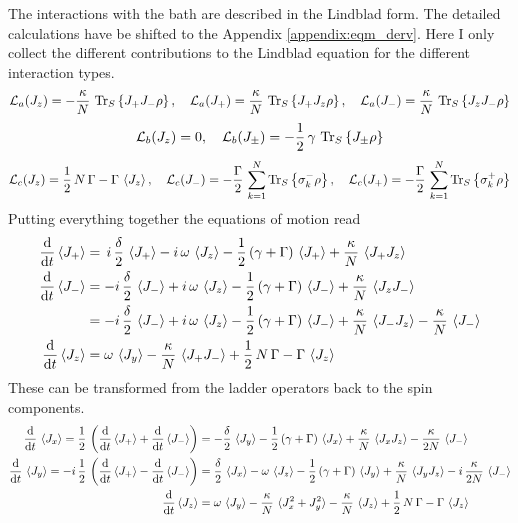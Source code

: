 \documentclass{article}
\begin{document}
The interactions with the bath are described in the Lindblad form. The detailed calculations have be shifted to the Appendix \ref{appendix:eqm_derv}. Here I only collect the different contributions to the Lindblad equation for the different interaction types.
\begin{align*}
    \mathcal{L}_a(J_z)=-\frac{\kappa}{N}\,\operatorname{Tr}_S\left\{J_+ J_- \rho\right\},\quad
    \mathcal{L}_a(J_+)=\frac{\kappa}{N}\,\operatorname{Tr}_S\left\{J_+ J_z \rho\right\},\quad
    \mathcal{L}_a(J_-)=\frac{\kappa}{N}\,\operatorname{Tr}_S\left\{J_z J_- \rho\right\}
\end{align*}
\begin{align*}
    \mathcal{L}_b(J_z)=0,\quad
    \mathcal{L}_b(J_\pm)=-\frac{1}{2}\,\gamma\,\operatorname{Tr}_S\left\{J_\pm\rho\right\}
\end{align*}
\begin{align*}
    \mathcal{L}_c(J_z)=\frac{1}{2}\,N\,\Gamma-\Gamma\,\braket{J_z},\quad
    \mathcal{L}_c(J_-)=-\frac{\Gamma}{2}\,\sum_{k=1}^N\operatorname{Tr}_S\left\{\sigma_k^-\rho\right\},\quad
    \mathcal{L}_c(J_+)=-\frac{\Gamma}{2}\,\sum_{k=1}^N\operatorname{Tr}_S\left\{\sigma_k^+\rho\right\}
\end{align*}
Putting everything together the equations of motion read
\begin{align*}
    \frac{\text{d}}{\text{d}t} \braket{J_+}&=\,i\,\frac{\delta}{2}\,\braket{J_+}-i\,\omega\,\braket{J_z}-\frac{1}{2}\,(\gamma+\Gamma)\,\braket{J_+}+\frac{\kappa}{N}\,\braket{J_+ J_z}\\
    \frac{\text{d}}{\text{d}t} \braket{J_-}&=-i\,\frac{\delta}{2}\,\braket{J_-}+i\,\omega\,\braket{J_z}-\frac{1}{2}\,(\gamma+\Gamma)\,\braket{J_-}+\frac{\kappa}{N}\,\braket{J_z J_-}\\
    &=-i\,\frac{\delta}{2}\,\braket{J_-}+i\,\omega\,\braket{J_z}-\frac{1}{2}\,(\gamma+\Gamma)\,\braket{J_-}+\frac{\kappa}{N}\,\braket{J_- J_z}-\frac{\kappa}{N}\,\braket{J_-}\\
    \frac{\text{d}}{\text{d}t} \braket{J_z}&=\omega\,\braket{J_y} - \frac{\kappa}{N}\,\braket{J_+ J_-}+\frac{1}{2}\,N\,\Gamma-\Gamma\,\braket{J_z}
\end{align*}
These can be transformed from the ladder operators back to the spin components.
\begin{align*}
    \frac{\text{d}}{\text{d}t}\,\braket{J_x}=\frac{1}{2}\,\left(\frac{\text{d}}{\text{d}t} \braket{J_+}+\frac{\text{d}}{\text{d}t} \braket{J_-}\right)&=-\frac{\delta}{2}\,\braket{J_y}-\frac{1}{2}\,(\gamma+\Gamma)\,\braket{J_x}+\frac{\kappa}{N}\,\braket{J_xJ_z}-\frac{\kappa}{2N}\,\braket{J_-}\\
    \frac{\text{d}}{\text{d}t}\,\braket{J_y}=-i\,\frac{1}{2}\,\left(\frac{\text{d}}{\text{d}t} \braket{J_+}-\frac{\text{d}}{\text{d}t} \braket{J_-}\right)&=\frac{\delta}{2}\,\braket{J_x}-\omega\,\braket{J_z}-\frac{1}{2}\,(\gamma+\Gamma)\,\braket{J_y}+\frac{\kappa}{N}\,\braket{J_yJ_z}-i\,\frac{\kappa}{2N}\,\braket{J_-}\\
    \frac{\text{d}}{\text{d}t} \braket{J_z}&=\omega\,\braket{J_y} - \frac{\kappa}{N}\,\braket{J_x^2+J_y^2} -\frac{\kappa}{N}\,\braket{J_z}+\frac{1}{2}\,N\,\Gamma-\Gamma\,\braket{J_z}
\end{align*}
\end{document}
